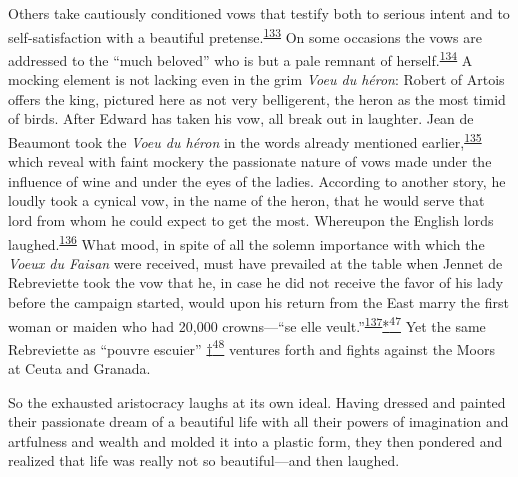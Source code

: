 Others take cautiously conditioned vows that testify both to serious
intent and to self-satisfaction with a beautiful
pretense.\textsuperscript{\protect\hypertarget{10_Chapter_Three__THE_HEROIC_DREAM.xhtmlux5cux23id_1669}{\protect\hyperlink{23_NOTES.xhtmlux5cux23id_1670}{133}}}
On some occasions the vows are addressed to the ``much beloved'' who is
but a pale remnant of
herself.\textsuperscript{\protect\hypertarget{10_Chapter_Three__THE_HEROIC_DREAM.xhtmlux5cux23id_1667}{\protect\hyperlink{23_NOTES.xhtmlux5cux23id_1668}{134}}}
A mocking element is not lacking even in the grim \emph{Voeu du héron}:
Robert of Artois offers the king, pictured here as not very belligerent,
the heron as the most timid of birds. After Edward has taken his vow,
all break out in laughter. Jean de Beaumont took the \emph{Voeu du
héron} in the words
\protect\hypertarget{10_Chapter_Three__THE_HEROIC_DREAM.xhtmlux5cux23page_103}{}{}already
mentioned
earlier,\textsuperscript{\protect\hypertarget{10_Chapter_Three__THE_HEROIC_DREAM.xhtmlux5cux23id_1665}{\protect\hyperlink{23_NOTES.xhtmlux5cux23id_1666}{135}}}
which reveal with faint mockery the passionate nature of vows made under
the influence of wine and under the eyes of the ladies. According to
another story, he loudly took a cynical vow, in the name of the heron,
that he would serve that lord from whom he could expect to get the most.
Whereupon the English lords
laughed.\textsuperscript{\protect\hypertarget{10_Chapter_Three__THE_HEROIC_DREAM.xhtmlux5cux23id_1663}{\protect\hyperlink{23_NOTES.xhtmlux5cux23id_1664}{136}}}
What mood, in spite of all the solemn importance with which the
\emph{Voeux du Faisan} were received, must have prevailed at the table
when Jennet de Rebreviette took the vow that he, in case he did not
receive the favor of his lady before the campaign started, would upon
his return from the East marry the first woman or maiden who had 20,000
crowns---``se elle
veult.''\textsuperscript{\protect\hypertarget{10_Chapter_Three__THE_HEROIC_DREAM.xhtmlux5cux23id_1661}{\protect\hyperlink{23_NOTES.xhtmlux5cux23id_1662}{137}}}\protect\hypertarget{10_Chapter_Three__THE_HEROIC_DREAM.xhtmlux5cux23id_2881}{\protect\hyperlink{23_NOTES.xhtmlux5cux23id_2882}{*\textsuperscript{47}}}
Yet the same Rebreviette as ``pouvre escuier''
\protect\hypertarget{10_Chapter_Three__THE_HEROIC_DREAM.xhtmlux5cux23id_2883}{\protect\hyperlink{23_NOTES.xhtmlux5cux23id_2884}{†\textsuperscript{48}}}
ventures forth and fights against the Moors at Ceuta and Granada.

So the exhausted aristocracy laughs at its own ideal. Having dressed and
painted their passionate dream of a beautiful life with all their powers
of imagination and artfulness and wealth and molded it into a plastic
form, they then pondered and realized that life was really not so
beautiful---and then laughed.

